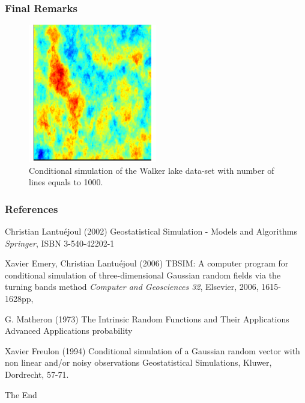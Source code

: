 \documentclass{beamer}
\begin{document}
\begin{frame}
 \frametitle{Final Remarks}
\begin{figure}
\begin{center}
\includegraphics[width=0.5\textwidth]{walker_lake_tb_n=1000.pdf}
\end{center}
\caption{Conditional simulation of the Walker lake data-set with number of lines equals to 1000.}
\label{fig:gaussian_unc_simulation}
\end{figure}
\end{frame}

\begin{frame}
\frametitle{References}
\footnotesize{
\begin{thebibliography}{99} %
 Christian Lantuéjoul (2002)
\newblock Geostatistical Simulation  - Models and Algorithms
\newblock \emph{Springer}, ISBN 3-540-42202-1

 Xavier Emery, Christian Lantuéjoul (2006)
\newblock TBSIM: A computer program for conditional simulation of three-dimensional Gaussian random fields via the turning bands method
\newblock \emph{Computer and Geosciences 32}, Elsevier, 2006, 1615-1628pp, 

 G. Matheron (1973)
\newblock The Intrinsic Random Functions and Their Applications
\newblock Advanced Applications probability

 Xavier Freulon (1994)
\newblock Conditional simulation of a Gaussian random vector with non linear and/or noisy observations
\newblock Geostatistical Simulations, Kluwer, Dordrecht, 57-71.
\end{thebibliography}
}
\end{frame}


\begin{frame}
\Huge{\centerline{The End}}
\end{frame}

\end{document}
